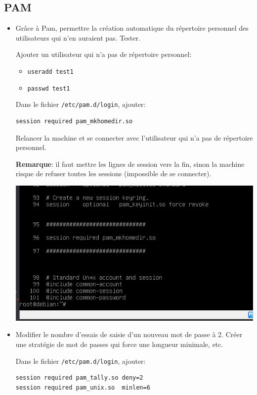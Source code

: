 \documentclass[a4paper]{article}
\begin{document}
\subsection{PAM}





\begin{itemize}

\item Grâce à Pam, permettre la création automatique du répertoire personnel des utilisateurs qui n'en auraient pas. Tester.
\begin{example}
    Ajouter un utilisateur qui n'a pas de répertoire personnel:
    \begin{itemize}
        \item \texttt{useradd test1}
        \item \texttt{passwd test1}
    \end{itemize}
    Dans le fichier \texttt{/etc/pam.d/login}, ajouter:
    \begin{verbatim}
session required pam_mkhomedir.so
    \end{verbatim}
    Relancer la machine et se connecter avec l'utilisateur qui n'a pas de répertoire personnel.
\end{example}
\textbf{Remarque}: il faut mettre les lignes de session vers la fin, sinon la machine risque de refuser toutes les sessions (impossible de se connecter).
\begin{center}
    \includegraphics[width=0.75\linewidth]{images/002.PNG}
\end{center}

\item Modifier le nombre d'essais de saisie d'un nouveau mot de passe à 2. Créer une stratégie de mot de passes qui force une longueur minimale, etc.
\begin{example}
    Dans le fichier \texttt{/etc/pam.d/login}, ajouter:
    \begin{verbatim}
session required pam_tally.so deny=2
session required pam_unix.so  minlen=6
    \end{verbatim}
\end{example}


\end{itemize}
\end{document}

